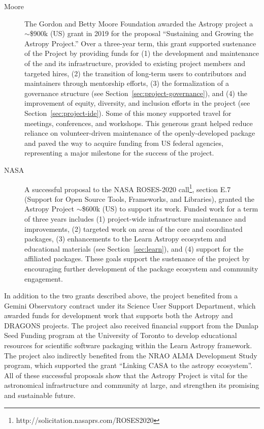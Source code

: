 \documentclass[modern]{aastex631}
\begin{document}
\begin{description}
    \item[Moore] The Gordon and Betty Moore Foundation awarded the Astropy
    project a $\sim$\$900k (US) grant in 2019 for the proposal ``Sustaining and
    Growing the Astropy Project.'' Over a three-year term, this grant supported
    sustenance of the Project by providing funds for (1) the development and
    maintenance of the \astropypkg and its infrastructure, provided to existing
    project members and targeted hires, (2) the transition of long-term users to
    contributors and maintainers through mentorship efforts, (3) the
    formalization of a governance structure (see
    Section~\ref{sec:project-governance}), and (4) the improvement of equity,
    diversity, and inclusion efforts in the project (see
    Section~\ref{sec:project-ide}). Some of this money supported travel for
    meetings, conferences, and workshops. This generous grant helped reduce
    reliance on volunteer-driven maintenance of the openly-developed package and
    paved the way to acquire funding from US federal agencies, representing a
    major milestone for the success of the project.

    \item[NASA] A successful proposal to the NASA ROSES-2020
    call\footnote{http://solicitation.nasaprs.com/ROSES2020}, section E.7
    (Support for Open Source Tools, Frameworks, and Libraries), granted the
    Astropy Project $\sim$\$600k (US) to support its work. Funded work for a
    term of three years includes (1) project-wide infrastructure maintenance and
    improvements, (2) targeted work on areas of the \astropy core and
    coordinated packages, (3) enhancements to the Learn
    Astropy ecosystem and educational materials (see Section~\ref{sec:learn}),
    and (4) support for the \astropy affiliated packages. These goals
    support the sustenance of the project by encouraging further
    development of the package ecosystem and community engagement.
\end{description}

In addition to the two grants described above, the project benefited from
a Gemini Observatory contract under its Science User Support Department,
which awarded funds for development work that supports both the Astropy and
DRAGONS projects. The project also received financial support from the Dunlap
Seed Funding program at the University of Toronto to develop educational
resources for scientific software packaging within the Learn Astropy
framework.  The project also indirectly benefited from the NRAO ALMA Development
Study program, which supported the grant ``Linking CASA to the astropy ecosystem''.
All of these successful proposals show that the Astropy Project
is vital for the astronomical infrastructure and community at large, and
strengthen its promising and sustainable future.
\end{document}
